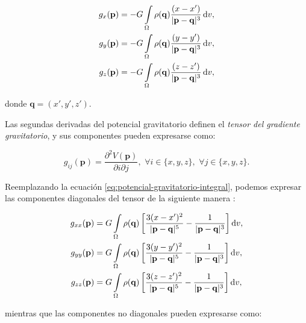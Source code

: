 \begin{align}
    g_x(\mathbf{p}) &=
        - G \int\limits_\Omega \rho(\mathbf{q})
        \frac{(x - x')}{|\mathbf{p} - \mathbf{q}|^3} \mathop{}\!\textnormal{d} v,
    \label{eq:gx-integral}
    \\
    g_y(\mathbf{p}) &=
        - G \int\limits_\Omega \rho(\mathbf{q})
        \frac{(y - y')}{|\mathbf{p} - \mathbf{q}|^3} \mathop{}\!\textnormal{d} v,
    \label{eq:gy-integral}
    \\
    g_z(\mathbf{p}) &=
        - G \int\limits_\Omega \rho(\mathbf{q})
        \frac{(z - z')}{|\mathbf{p} - \mathbf{q}|^3} \mathop{}\!\textnormal{d} v,
    \label{eq:gz-integral}
\end{align}

\noindent donde $\mathbf{q} = (x', y', z')$.

Las segundas derivadas del potencial gravitatorio definen el \emph{tensor del
gradiente gravitatorio}, y sus componentes pueden expresarse como:

\begin{equation}
    g_{ij}(\mathbf{p}) =
        \frac{\partial^2 V(\mathbf{p})}{\partial i \partial j}, \,\,
        \forall i \in \{x, y, z\}, \,\,
        \forall j \in \{x, y, z\}.
\end{equation}

Reemplazando la ecuación \ref{eq:potencial-gravitatorio-integral}, podemos
expresar las componentes diagonales del tensor de la siguiente manera
\citep{grombein2013}:

\begin{align}
    g_{xx}(\mathbf{p}) &=
        G \int\limits_\Omega \rho(\mathbf{q})
        \left[
        \frac{3(x - x')^2}{|\mathbf{p} - \mathbf{q}|^5}
        - \frac{1}{|\mathbf{p} - \mathbf{q}|^3}
        \right]
        \mathop{}\!\textnormal{d} v,
    \label{eq:gxx-integral}
    \\
    g_{yy}(\mathbf{p}) &=
        G \int\limits_\Omega \rho(\mathbf{q})
        \left[
        \frac{3(y - y')^2}{|\mathbf{p} - \mathbf{q}|^5}
        - \frac{1}{|\mathbf{p} - \mathbf{q}|^3}
        \right]
        \mathop{}\!\textnormal{d} v,
    \label{eq:gyy-integral}
    \\
    g_{zz}(\mathbf{p}) &=
        G \int\limits_\Omega \rho(\mathbf{q})
        \left[
        \frac{3(z - z')^2}{|\mathbf{p} - \mathbf{q}|^5}
        - \frac{1}{|\mathbf{p} - \mathbf{q}|^3}
        \right]
        \mathop{}\!\textnormal{d} v,
    \label{eq:gzz-integral}
\end{align}

\noindent mientras que las componentes no diagonales pueden expresarse como:

